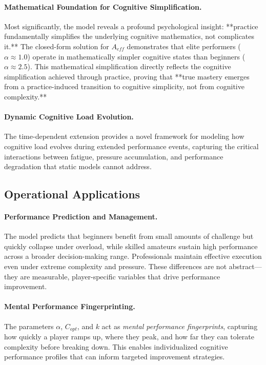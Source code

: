 \documentclass{article}
\begin{document}
\paragraph{Mathematical Foundation for Cognitive Simplification.} Most significantly, the model reveals a profound 
psychological insight: **practice fundamentally simplifies the underlying cognitive mathematics, not complicates it.** 
The closed-form solution for $A_{eff}$ demonstrates that elite performers ($\alpha \approx 1.0$) operate in 
mathematically simpler cognitive states than beginners ($\alpha \approx 2.5$). This mathematical simplification 
directly reflects the cognitive simplification achieved through practice, proving that **true mastery emerges from 
a practice-induced transition to cognitive simplicity, not from cognitive complexity.**

\paragraph{Dynamic Cognitive Load Evolution.} The time-dependent extension provides a novel framework for modeling 
how cognitive load evolves during extended performance events, capturing the critical interactions between fatigue, 
pressure accumulation, and performance degradation that static models cannot address.

\subsection*{Operational Applications}

\paragraph{Performance Prediction and Management.} The model predicts that beginners benefit from small amounts of 
challenge but quickly collapse under overload, while skilled amateurs sustain high performance across a broader 
decision-making range. Professionals maintain effective execution even under extreme complexity and pressure. These 
differences are not abstract—they are measurable, player-specific variables that drive performance improvement.

\paragraph{Mental Performance Fingerprinting.} The parameters $\alpha$, $C_{opt}$, and $k$ act as \textit{mental 
performance fingerprints}, capturing how quickly a player ramps up, where they peak, and how far they can tolerate 
complexity before breaking down. This enables individualized cognitive performance profiles that can inform targeted 
improvement strategies.
\end{document}
